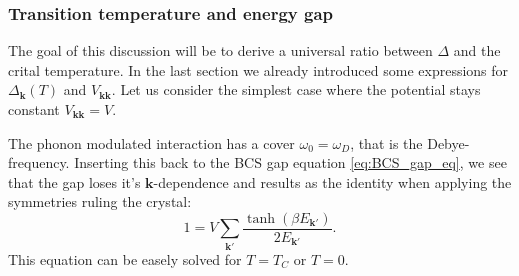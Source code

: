 \documentclass[../main.tex]{subfile}
\begin{document}
\subsubsection{Transition temperature and energy gap}
The goal of this discussion will be to derive a universal ratio between $\Delta$ and the crital temperature. In the last section 
we already introduced some expressions for $\Delta_{\bm{k}}(T)$ and $V_{\bm{k}\bm{k}}$. Let us consider the simplest case where the potential stays constant $V_{\bm{k}\bm{k}} = V$.

The phonon modulated interaction has a cover $\omega_0 = \omega_D$, that is the Debye-frequency. Inserting this back to the BCS gap equation 
\ref{eq:BCS_gap_eq}, we see that the gap loses it's $\bm{k}$-dependence and results as the identity when applying the symmetries
ruling the crystal:
\begin{equation*}
    1 = V\sum_{\bm{k}'} \frac{\tanh\left(\beta E_{\bm{k}'}\right)}{2 E_{\bm{k}'}}.
\end{equation*}
This equation can be easely solved for $T=T_C$ or $T = 0$.\\
\end{document}
